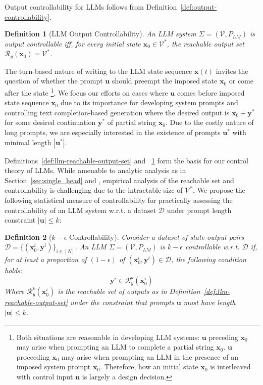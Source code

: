 \documentclass{article} %
\newtheorem{definition}{Definition}
\begin{document}
Output controllability for LLMs follows from Definition~\ref{def:output-controllability}. 

\begin{definition}[LLM Output Controllability]
\label{def:llm-output-controllability}
An LLM system $\Sigma = (\mathcal V, P_{LM})$ is output controllable iff, for every initial state $\mathbf x_0 \in \mathcal V^*$, the reachable output set $\mathcal R_y(\mathbf x_0) = \mathcal V^*$.
\end{definition}

The turn-based nature of writing to the LLM state sequence $\mathbf x(t)$ invites the question of whether the prompt $\mathbf u$ should preempt the imposed state $\mathbf x_0$ or come after the state
\footnote{Both situations are reasonable in developing LLM systems: $\mathbf u$ preceding $\mathbf x_0$ may arise when prompting an LLM to complete a partial string $\mathbf x_0$. $\mathbf u$ proceeding $\mathbf x_0$ may arise when prompting an LLM in the presence of an imposed system prompt $\mathbf x_0$. Therefore, how an initial state $\mathbf x_0$ is interleaved with control input $\mathbf u$ is largely a design decision.}. 
We focus our efforts on cases where $\mathbf u$ comes before imposed state sequence $\mathbf x_0$ due to its importance for developing system prompts and controlling text completion-based generation where the desired output is $\mathbf x_0 + \mathbf y^*$ for some desired continuation $\mathbf y^*$ of partial string $\mathbf x_0$.
Due to the costly nature of long prompts, we are especially interested in the existence of prompts $\mathbf u^*$ with minimal length $|\mathbf u^*|$. 

Definitions~\ref{def:llm-reachable-output-set} and ~\ref{def:llm-output-controllability} form the basis for our control theory of LLMs. 
While amenable to analytic analysis as in Section~\ref{sec:single_head} and \cite{soatto2023taming}, empirical analysis of the reachable set and controllability is challenging due to the intractable size of $\mathcal V^*$.
We propose the following statistical measure of controllability for practically assessing the controllability of an LLM system w.r.t. a dataset $\mathcal D$ under prompt length constraint $|\mathbf u| \leq k$: 

\begin{definition}[$k-\epsilon$ Controllability]
\label{def:k-eps}
Consider a dataset of state-output pairs $\mathcal D = \{(\mathbf x_0^i, \mathbf y^i)\}_{i\in [N]}$. An LLM $\Sigma = (\mathcal V, P_{LM})$ is $k-\epsilon$ controllable w.r.t. $\mathcal D$ if, for at least a proportion of $(1-\epsilon)$ of $(\mathbf x_0^i, \mathbf y^i)\in \mathcal D$, the following condition holds:
\begin{equation}
    \label{eqn:k-epsilon}
    \mathbf y^i \in \mathcal R^k_y(\mathbf x_0^i)  
\end{equation}
Where $\mathcal R^k_y(\mathbf x_0^i)$ is the reachable set of outputs as in Definition~\ref{def:llm-reachable-output-set} under the constraint that prompts $\mathbf u$ must have length $|\mathbf u|\leq k$. 
\end{definition}
\end{document}
